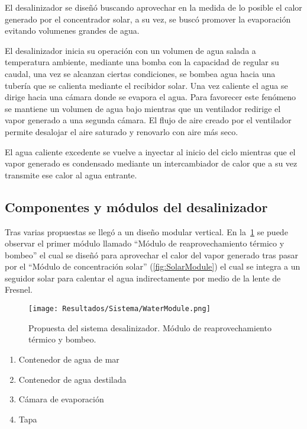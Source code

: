 			El desalinizador se diseñó buscando aprovechar en la medida de lo posible el calor generado por el concentrador solar, a su vez, se buscó promover la evaporación evitando volumenes grandes de agua.
			
			El desalinizador inicia su operación con un volumen de agua salada a temperatura ambiente, mediante una bomba con la capacidad de regular su caudal, una vez se alcanzan ciertas condiciones, se bombea agua hacia una tubería que se calienta mediante el recibidor solar. Una vez caliente el agua se dirige hacia una cámara donde se evapora el agua. Para favorecer este fenómeno se mantiene un volumen de agua bajo mientras que un ventilador redirige el vapor generado a una segunda cámara. El flujo de aire creado por el ventilador permite desalojar el aire saturado y renovarlo con aire más seco.
			
			El agua caliente excedente se vuelve a inyectar al inicio del ciclo mientras que el vapor generado es condensado mediante un intercambiador de calor que a su vez transmite ese calor al agua entrante.
		
	
		\subsection{Componentes y módulos del desalinizador}
			
			Tras varias propuestas se llegó a un diseño modular vertical. En la~\cref{fig:WaterModule} se puede observar el primer módulo llamado ``Módulo de reaprovechamiento térmico y bombeo'' el cual se diseñó para aprovechar el calor del vapor generado tras pasar por el ``Módulo de concentración solar'' (\cref{fig:SolarModule}) el cual se integra a un seguidor solar para calentar el agua indirectamente por medio de la lente de Fresnel.
		
		
			\begin{figure}[H]
				\centering
				\texttt{[image: Resultados/Sistema/WaterModule.png]}
				\caption{Propuesta del sistema desalinizador. Módulo de reaprovechamiento térmico y bombeo.}
				\label{fig:WaterModule}
			\end{figure}
			
			\begin{enumerate}[columns=2]
				\item Contenedor de agua de mar
				\item Contenedor de agua destilada
				\item Cámara de evaporación
				\item Tapa
			\end{enumerate}
			

